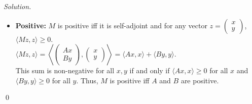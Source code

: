 \documentclass[12pt,a4paper]{article}
\newenvironment{solution}{%
  \par\noindent\textit{Solution.}\ }{\qed}
\theoremstyle{problemstyle}
\begin{document}
\begin{solution}
\begin{itemize}
    \item \textbf{Positive:} $M$ is positive iff it is self-adjoint and for any vector $z = \begin{pmatrix} x \\ y \end{pmatrix}$, $\langle Mz, z \rangle \ge 0$. \\
    $\langle Mz, z \rangle = \left\langle \begin{pmatrix} Ax \\ By \end{pmatrix}, \begin{pmatrix} x \\ y \end{pmatrix} \right\rangle = \langle Ax, x \rangle + \langle By, y \rangle$. \\
    This sum is non-negative for all $x, y$ if and only if $\langle Ax, x \rangle \ge 0$ for all $x$ and $\langle By, y \rangle \ge 0$ for all $y$. Thus, $M$ is positive iff $A$ and $B$ are positive.
\end{itemize}
\end{solution}
\end{document}
